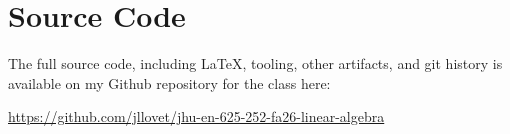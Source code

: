 \documentclass[10pt,letterpaper,final]{report}
\begin{document}
\pagebreak

\section*{Source Code}
The full source code, including LaTeX, tooling, other artifacts, and git history is available on my Github repository for the class here:
\begin{center}
  \url{https://github.com/jllovet/jhu-en-625-252-fa26-linear-algebra}
\end{center}

\printbibliography
\end{document}
